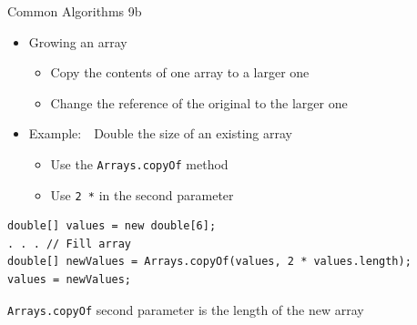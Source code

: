 \documentclass[aspectratio=43,10pt,t]{beamer}
\newcommand{\code}[1]{\texttt{#1}}
\newcommand{\callout}[2][\linewidth]{%
  {\setlength{\fboxsep}{3pt}\colorbox{callout}{%
    \parbox{\dimexpr#1-6pt\relax}{\raggedright\footnotesize #2}}}}
\begin{document}
\begin{frame}[fragile]{Common Algorithms 9b}
  \begin{itemize}
    \item Growing an array
      \begin{itemize}
        \item Copy the contents of one array to a larger one
        \item Change the reference of the original to the larger one
      \end{itemize}
    \item Example:\ \ Double the size of an existing array
      \begin{itemize}
        \item Use the \code{Arrays.copyOf} method
        \item Use \code{2 *} in the second parameter
      \end{itemize}
  \end{itemize}
\begin{lstlisting}
double[] values = new double[6];
. . . // Fill array
double[] newValues = Arrays.copyOf(values, 2 * values.length);
values = newValues;
\end{lstlisting}
  \hfill\callout[0.45\linewidth]{\code{Arrays.copyOf} second parameter is the length of the new array}
\end{frame}
\end{document}

